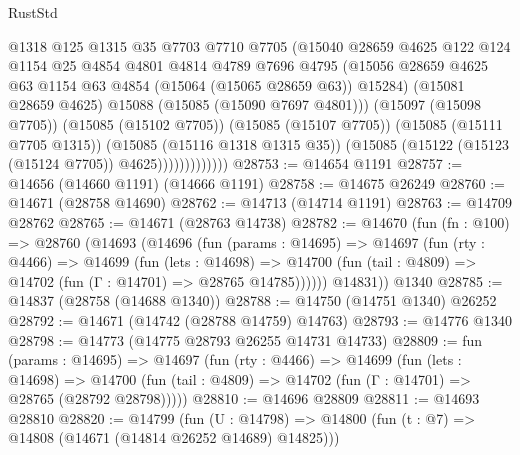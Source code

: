 \begin{lexlean}{RustStd}
\begin{coremodule}
                          @1318
                          @125
                          @1315
                          @35
                          @7703
                          @7710
                          @7705
                          (@15040
                            @28659
                            @4625
                            @122
                            @124
                            @1154
                            @25
                            @4854
                            @4801
                            @4814
                            @4789
                            @7696
                            @4795
                            (@15056
                              @28659
                              @4625
                              @63
                              @1154
                              @63
                              @4854
                              (@15064 (@15065 @28659 @63))
                              @15284)
                            (@15081 @28659 @4625)
                            @15088
                            (@15085 (@15090 @7697 @4801)))
                          (@15097 (@15098 @7705))
                          (@15085 (@15102 @7705))
                          (@15085 (@15107 @7705))
                          (@15085 (@15111 @7705 @1315))
                          (@15085 (@15116 @1318 @1315 @35))
                          (@15085 (@15122 (@15123 (@15124 @7705)) @4625)))))))))))))
@28753 := @14654 @1191
@28757 := @14656 (@14660 @1191) (@14666 @1191)
@28758 := @14675 @26249
@28760 := @14671 (@28758 @14690)
@28762 := @14713 (@14714 @1191)
@28763 := @14709 @28762
@28765 := @14671 (@28763 @14738)
@28782 := @14670
    (fun (fn : @100) =>
    @28760
      (@14693
        (@14696
          (fun (params : @14695) =>
          @14697
            (fun (rty : @4466) =>
            @14699
              (fun (lets : @14698) =>
              @14700 (fun (tail : @4809) => @14702 (fun (Γ : @14701) => @28765 @14785))))))
        @14831))
    @1340
@28785 := @14837 (@28758 (@14688 @1340))
@28788 := @14750 (@14751 @1340) @26252
@28792 := @14671 (@14742 (@28788 @14759) @14763)
@28793 := @14776 @1340
@28798 := @14773 (@14775 @28793 @26255 @14731 @14733)
@28809 := fun (params : @14695) =>
  @14697
    (fun (rty : @4466) =>
    @14699
      (fun (lets : @14698) =>
      @14700 (fun (tail : @4809) => @14702 (fun (Γ : @14701) => @28765 (@28792 @28798)))))
@28810 := @14696 @28809
@28811 := @14693 @28810
@28820 := @14799
    (fun (U : @14798) => @14800 (fun (t : @7) => @14808 (@14671 (@14814 @26252 @14689) @14825)))

\end{coremodule}
\end{lexlean}
